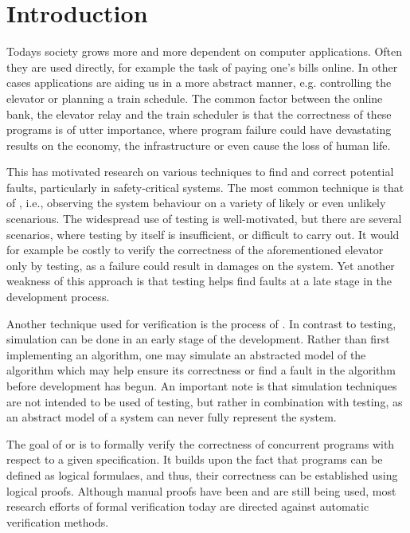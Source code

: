 \newpage
\section{Introduction}
Todays society grows more and more dependent on computer applications. Often they are used directly, for example the task of paying one's bills online. In other cases applications are aiding us in a more abstract manner, e.g. controlling the elevator or planning a train schedule. The common factor between the online bank, the elevator relay and the train scheduler is that the correctness of these programs is of utter importance, where program failure could have devastating results on the economy, the infrastructure or even cause the loss of human life.

This has motivated research on various techniques to find and correct potential faults, particularly in safety-critical systems. The most common technique is that of , i.e., observing the system behaviour on a variety of likely or even unlikely scenarious. The widespread use of testing is well-motivated, but there are several scenarios, where testing by itself is insufficient, or difficult to carry out. It would for example be costly to verify the correctness of the aforementioned elevator only by testing, as a failure could result in damages on the system. Yet another weakness of this approach is that testing helps find faults at a late stage in the development process.

Another technique used for verification is the process of . In contrast to testing, simulation can be done in an early stage of the development. Rather than first implementing an algorithm, one may simulate an abstracted model of the algorithm which may help ensure its correctness or find a fault in the algorithm before development has begun. An important note is that simulation techniques are not intended to be used  of testing, but rather in combination with testing, as an abstract model of a system can never fully represent the system.

The goal of  or  is to formally verify the correctness of concurrent programs with respect to a given specification. It builds upon the fact that programs can be defined as logical formulaes, and thus, their correctness can be established using logical proofs. Although manual proofs have been and are still being used, most research efforts of formal verification today are directed against automatic verification methods.

